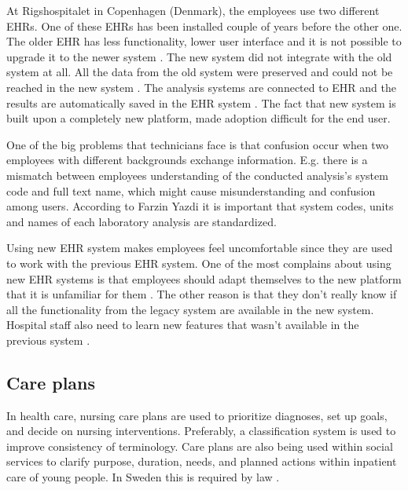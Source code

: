 \documentclass[14pt]{article}
\begin{document}
At Rigshospitalet in Copenhagen (Denmark), the employees use two different \glspl{EHR}. One of these \glspl{EHR} has been installed couple of years before the other one. The older \gls{EHR} has less functionality, lower user interface and it is not possible to upgrade it to the newer system \cite{FarzinYazdi}. The new system did not integrate with the old system at all. All the data from the old system were preserved and could not be reached in the new system \cite{FarzinYazdi}. The analysis systems are connected to \gls{EHR} and the results are automatically saved in the \gls{EHR} system \cite{FarzinYazdi}. The fact that new system is built upon a completely new platform, made adoption difficult for the end user\cite{FarzinYazdi}.

One of the big problems that technicians face is that confusion occur when two employees with different backgrounds exchange information. E.g. there is a mismatch between employees understanding of the conducted analysis's system code and full text name, which might cause misunderstanding and confusion among users\cite{FarzinYazdi}. According to Farzin Yazdi\cite{FarzinYazdi} it is important that system codes, units and names of each laboratory analysis are standardized.

Using new \gls{EHR} system makes employees feel uncomfortable since they are used to work with the previous \gls{EHR} system. One of the most complains about using new \gls{EHR} systems is that employees should adapt themselves to the new platform that it is unfamiliar for them \cite{FarzinYazdi}. The other reason is that they don’t really know if all the functionality from the legacy system are available in the new system. Hospital staff also need to learn new features that wasn't available in the previous system \cite{FarzinYazdi}.
\label{sec:techMotiv}

\subsection{Care plans}
\label{sec:interopPlans}
In health care, nursing care plans are used to prioritize diagnoses, set up goals, and decide on nursing interventions. Preferably, a classification system is used to improve consistency of terminology. Care plans are also being used within social services to clarify purpose, duration, needs, and planned actions within inpatient care of young people. In Sweden this is required by law \cite{SocialServices}.
\end{document}
